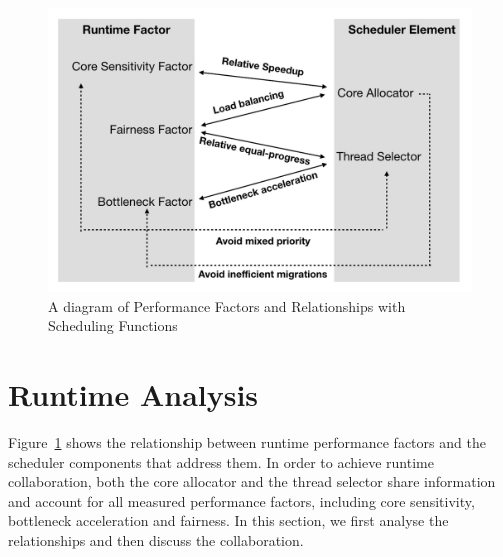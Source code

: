 \begin{figure}
\centering
\includegraphics[scale=0.4]{figures/mfa.pdf}
\caption{A diagram of Performance Factors and Relationships with Scheduling Functions}
\label{figure:f11}
\end{figure} 

\section{Runtime Analysis}
Figure~\ref{figure:f11} shows the relationship between runtime performance factors and the scheduler components that address them. 
In order to achieve runtime collaboration, both the core allocator and the thread selector share information and account for all measured performance factors, including core sensitivity, bottleneck acceleration and fairness. In this section, we first analyse the relationships and then discuss the collaboration. 
